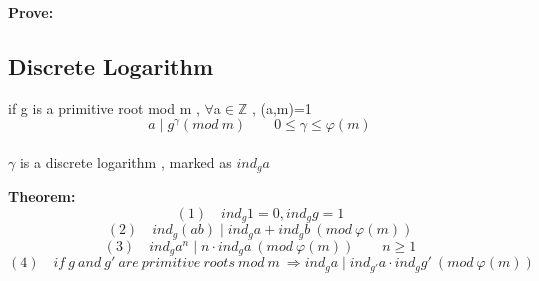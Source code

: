 \documentclass{ctexart}
\begin{document}
\vspace{12 pt}
\textbf{Prove:}

\vspace{12 pt}
\subsection{Discrete Logarithm}
if g is a primitive root mod m , \(\forall\)a\(\in\)\(\mathbb{Z}\) , (a,m)=1
\[a\mid g^{\gamma}(mod\ m)\qquad 0\leq \gamma \leq \varphi(m)\]
\\\(\gamma\) is a discrete logarithm , marked as \(ind_ga\)

\vspace{12 pt}
\textbf{Theorem:}
\[(1)\quad ind_g1=0,ind_gg=1\]
\[(2)\quad ind_g(ab)\mid ind_ga+ind_gb\ (mod\ \varphi(m))\]
\[(3)\quad ind_ga^n\mid n\cdot ind_ga\ (mod\ \varphi(m))\qquad n\geq 1\]
\[(4)\quad if\ g\ and\ g'\ are\ primitive\ roots\ mod\ m\ \Rightarrow ind_ga\mid ind_{g'}a\cdot ind_gg'\ (mod\ \varphi(m))\]
\end{document}
